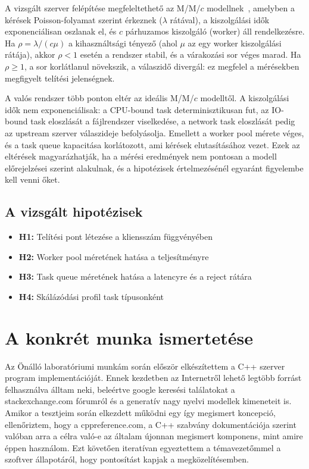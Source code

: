 \documentclass[11pt,a4paper]{article}
\begin{document}
A vizsgált szerver felépítése megfeleltethető az M/M/$c$ modellnek~\cite{kleinrock1975}, amelyben
a kérések Poisson-folyamat szerint érkeznek ($\lambda$ rátával), a kiszolgálási idők exponenciálisan
oszlanak el, és $c$ párhuzamos kiszolgáló (worker) áll rendelkezésre. Ha $\rho = \lambda / (c \mu)$
a kihasználtsági tényező (ahol $\mu$ az egy worker kiszolgálási rátája), akkor $\rho < 1$ esetén
a rendszer stabil, és a várakozási sor véges marad. Ha $\rho \geq 1$, a sor korlátlanul növekszik,
a válaszidő divergál: ez megfelel a mérésekben megfigyelt telítési jelenségnek.

A valós rendszer több ponton eltér az ideális M/M/$c$ modelltől. A kiszolgálási idők nem
exponenciálisak: a CPU-bound task determinisztikusan fut, az IO-bound task eloszlását a
fájlrendszer viselkedése, a network task eloszlását pedig az upstream szerver válaszideje
befolyásolja. Emellett a worker pool mérete véges, és a task queue kapacitása korlátozott,
ami kérések elutasításához vezet. Ezek az eltérések magyarázhatják, ha a mérési eredmények
nem pontosan a modell előrejelzései szerint alakulnak, és a hipotézisek értelmezésénél
egyaránt figyelembe kell venni őket.

\subsection{A vizsgált hipotézisek}
\label{ssec:hipotezisek}


 \begin{itemize}
     \item \textbf{H1:} Telítési pont létezése a kliensszám függvényében
     \item \textbf{H2:} Worker pool méretének hatása a teljesítményre
     \item \textbf{H3:} Task queue méretének hatása a latencyre és a reject rátára
     \item \textbf{H4:} Skálázódási profil task típusonként
 \end{itemize}


\section{A konkrét munka ismertetése}
\label{sec:munka}
% 
Az Önálló laboratóriumi munkám során először elkészítettem a C++ szerver program implementációját.
Ennek kezdetben az Internetről lehető legtöbb forrást felhasználva álltam neki, beleértve
google keresési találatokat a stackexchange.com fórumról és a generatív nagy nyelvi modellek kimeneteit is.
Amikor a tesztjeim során elkezdett működni egy így megismert koncepció, ellenőriztem, hogy a cppreference.com, a C++ szabvány
dokumentációja szerint valóban arra a célra való-e az általam újonnan megismert komponens, mint amire éppen használom.
Ezt követően iteratívan egyeztettem a témavezetőmmel a szoftver állapotáról, hogy pontosítást kapjak a megközelítésemben.
\end{document}
